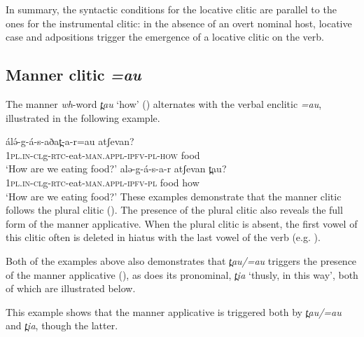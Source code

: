 In summary, the syntactic conditions for the locative clitic are parallel to the ones for the instrumental clitic: in the absence of an overt nominal host, locative case and adpositions trigger the emergence of a locative clitic on the verb. 


\subsection{Manner clitic \textit{=au}}\label{sec:ch11:manner}

The manner \textit{wh}-word \textit{t̪au} `how' () alternates with the verbal enclitic \textit{=au}, illustrated in the following example.

\ea   
\ea \gll álə́-g-á-s-aðat̪-a-r=au atʃevan?\\
		 \textsc{1pl.in-cl}g-\textsc{rtc}-eat-\textsc{man.appl-ipfv-pl-how} food\\
	\glt `How are we eating food?'
\ex \gll alə-g-á-s-a-r atʃevan t̪au?\\
		 \textsc{1pl.in-cl}g-\textsc{rtc}-eat-\textsc{man.appl-ipfv-pl} food how\\
\glt `How are we eating food?'
\z 
\z 
These examples demonstrate that the manner clitic follows the plural clitic (). The presence of the plural clitic also reveals the full form of the manner applicative. When the plural clitic is absent, the first vowel of this clitic often is deleted in hiatus with the last vowel of the verb (e.g. ).

Both of the examples above also demonstrates that   \textit{t̪au/=au} triggers the presence of the manner applicative (\sectref{}), as does its pronominal, \textit{t̪ia} `thusly, in this way', both of which are illustrated below.
\ea   
{}\label{ex:ch11:sweepq}
\z 
\z 

This example shows that the manner applicative is triggered both by  \textit{t̪au/=au} and \textit{t̪ia}, though the latter.




%
